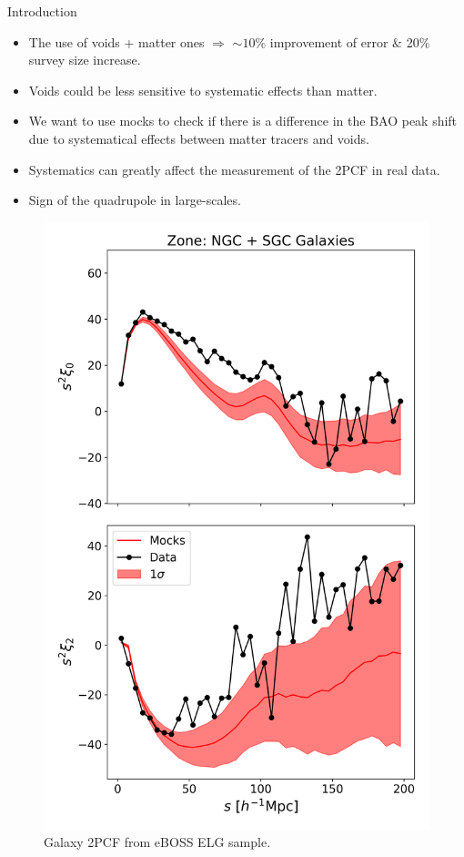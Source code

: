 \documentclass{beamer}
\begin{document}
\begin{frame}[allowframebreaks]{Introduction}
\begin{itemize}
	\item The use of voids + matter ones $\Rightarrow$ $\sim10\%$ improvement of error \& 20\% survey size increase.
	\item Voids could be less sensitive to systematic effects than matter.
	\item We want to use mocks to check if there is a difference in the BAO peak shift due to systematical effects between matter tracers and voids.
	\item Systematics can greatly affect the measurement of the 2PCF in real data.
	\item Sign of the quadrupole in large-scales.
\end{itemize}
\pagebreak
\begin{multicols}{2}
\begin{figure}
	\centering
	\includegraphics[width=0.7\linewidth]{plots/gal_CBZ}
	\caption{Galaxy 2PCF from eBOSS ELG sample.}
	\label{fig:galcbz}
\end{figure}
\begin{figure}
	\centering

\end{figure}
\end{multicols}
\end{frame}
\end{document}

